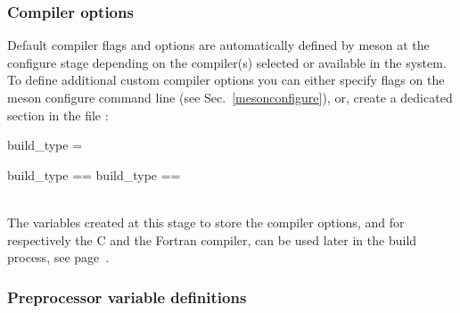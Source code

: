 \newpage
\subsubsection*{Compiler options}

Default compiler flags and options are automatically defined by meson at the configure stage
depending on the compiler(s) selected or available in the system. \\ 
To define additional custom compiler options you can either specify flags on the meson configure command line (see Sec.~\ref{mesonconfigure}), or, create a dedicated section in the file : 
\begin{script}
build\_type = 

 build\_type == 
 build\_type == 
\end{script}
\\[-0.5cm]
\noindent The variables created at this stage to store the compiler options,  and  for respectively the C and the Fortran compiler, can be used later in the build process, see page~\pageref{build_rules_meson}. 
\newpage
\subsubsection*{Preprocessor variable definitions}

